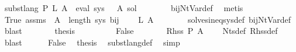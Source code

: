 \begin{isabellebody}
\ {\isachardoublequoteopen}subst{\isacharunderscore}{\kern0pt}lang\ P\ {\isacharquery}{\kern0pt}L{\isacharprime}{\kern0pt}\ A\ {\isacharequal}{\kern0pt}\ eval\ {\isacharparenleft}{\kern0pt}sys\ {\isacharbang}{\kern0pt}\ {\isasymgamma}{\isacharprime}{\kern0pt}\ A{\isacharparenright}{\kern0pt}\ sol{\isacharprime}{\kern0pt}{\isachardoublequoteclose}\isanewline
\ \ \ \ \ \ \isamarkupfalse%
\ bij{\isacharunderscore}{\kern0pt}Nt{\isacharunderscore}{\kern0pt}Var{\isacharunderscore}{\kern0pt}def\ \isamarkupfalse%
\ metis\isanewline
\ \ \ \ \isamarkupfalse%
\ \isamarkupfalse%
\ True\ assms{\isacharparenleft}{\kern0pt}{}{\isacharparenright}{\kern0pt}\ {\isacartoucheopen}{\isasymgamma}{\isacharprime}{\kern0pt}\ A\ {\isacharless}{\kern0pt}\ length\ sys{\isacartoucheclose}\ bij{\isacharunderscore}{\kern0pt}{\isasymgamma}{\isacharunderscore}{\kern0pt}{\isasymgamma}{\isacharprime}{\kern0pt}\ \isamarkupfalse%
\ {\isachardoublequoteopen}{\isasymdots}\ {\isasymsubseteq}\ {\isacharquery}{\kern0pt}L{\isacharprime}{\kern0pt}\ A{\isachardoublequoteclose}\isanewline
\ \ \ \ \ \ \isamarkupfalse%
\ solves{\isacharunderscore}{\kern0pt}ineq{\isacharunderscore}{\kern0pt}sys{\isacharunderscore}{\kern0pt}def\ bij{\isacharunderscore}{\kern0pt}Nt{\isacharunderscore}{\kern0pt}Var{\isacharunderscore}{\kern0pt}def\ \isamarkupfalse%
\ blast\isanewline
\ \ \ \ \isamarkupfalse%
\ \isamarkupfalse%
\ {\isacharquery}{\kern0pt}thesis\ \isakeywordONE{{\isachardot}{\kern0pt}}\isamarkupfalse%
\isanewline
\ \ \isamarkupfalse%
\isanewline
\ \ \ \ \isamarkupfalse%
\ False\isanewline
\ \ \ \ \isamarkupfalse%
\ \isamarkupfalse%
\ {\isachardoublequoteopen}Rhss\ P\ A\ {\isacharequal}{\kern0pt}\ {\isacharbraceleft}{\kern0pt}{\isacharbraceright}{\kern0pt}{\isachardoublequoteclose}\ \isamarkupfalse%
\ Nts{\isacharunderscore}{\kern0pt}def\ Rhss{\isacharunderscore}{\kern0pt}def\ \isamarkupfalse%
\ blast\isanewline
\ \ \ \ \isamarkupfalse%
\ False\ \isamarkupfalse%
\ {\isacharquery}{\kern0pt}thesis\ \isamarkupfalse%
\ subst{\isacharunderscore}{\kern0pt}lang{\isacharunderscore}{\kern0pt}def\ \isamarkupfalse%
\ simp\isanewline
\ \ \isamarkupfalse%
\isanewline
\ \ \isamarkupfalse%

\end{isabellebody}
